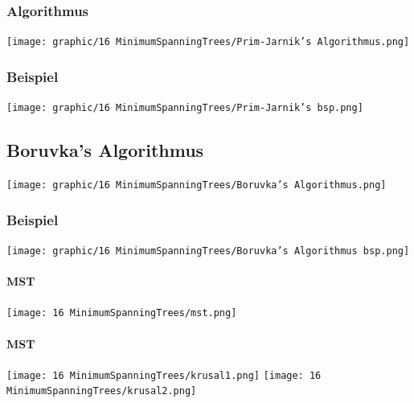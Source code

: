 \subsubsection{Algorithmus}
\begin{center}
    \texttt{[image: graphic/16 MinimumSpanningTrees/Prim-Jarnik’s Algorithmus.png]}
\end{center}
\vspace{-8pt}

\subsubsection{Beispiel}
\begin{center}
    \texttt{[image: graphic/16 MinimumSpanningTrees/Prim-Jarnik’s bsp.png]}
\end{center}
\vspace{-8pt}

\subsection{Boruvka’s Algorithmus}
\begin{center}
    \texttt{[image: graphic/16 MinimumSpanningTrees/Boruvka’s Algorithmus.png]}
\end{center}
\vspace{-8pt}
\subsubsection{Beispiel}
\begin{center}
    \texttt{[image: graphic/16 MinimumSpanningTrees/Boruvka’s Algorithmus bsp.png]}
\end{center}
\vspace{-8pt}


\paragraph{MST}
\begin{center}
    \texttt{[image: 16 MinimumSpanningTrees/mst.png]}
\end{center}

\paragraph{MST}
\begin{center}
    \texttt{[image: 16 MinimumSpanningTrees/krusal1.png]}
    \texttt{[image: 16 MinimumSpanningTrees/krusal2.png]}
\end{center}



\newpage